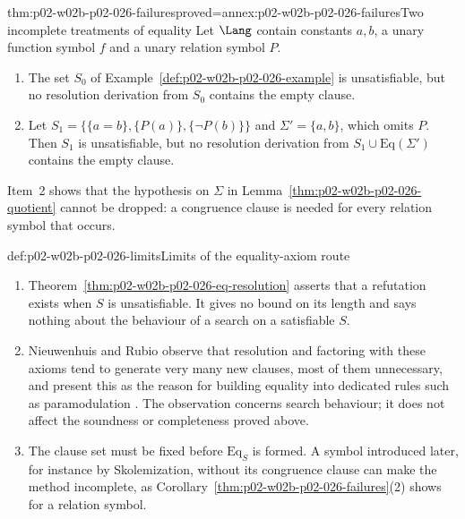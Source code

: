 \begin{hbcorollary}{thm:p02-w02b-p02-026-failures}{proved=annex:p02-w02b-p02-026-failures}{Two incomplete treatments of equality}
Let \(\Lang\) contain constants \(a,b\), a unary function symbol \(f\) and a
unary relation symbol \(P\).
\begin{enumerate}
  \item The set \(S_0\) of Example~\ref{def:p02-w02b-p02-026-example} is
        unsatisfiable, but no resolution derivation from \(S_0\) contains
        the empty clause.
  \item Let \(S_1=\bigl\{\{a=b\},\{P(a)\},\{\neg P(b)\}\bigr\}\) and
        \(\Sigma'=\{a,b\}\), which omits \(P\).  Then \(S_1\) is
        unsatisfiable, but no resolution derivation from
        \(S_1\cup\mathrm{Eq}(\Sigma')\) contains the empty clause.
\end{enumerate}
\end{hbcorollary}

Item~2 shows that the hypothesis on \(\Sigma\) in
Lemma~\ref{thm:p02-w02b-p02-026-quotient} cannot be dropped: a congruence
clause is needed for every relation symbol that occurs.

\begin{hbwarning}{def:p02-w02b-p02-026-limits}{Limits of the equality-axiom route}
\begin{enumerate}
  \item Theorem~\ref{thm:p02-w02b-p02-026-eq-resolution} asserts that a
        refutation exists when \(S\) is unsatisfiable.  It gives no bound on
        its length and says nothing about the behaviour of a search on a
        satisfiable \(S\).
  \item Nieuwenhuis and Rubio observe that resolution and factoring with
        these axioms tend to generate very many new clauses, most of them
        unnecessary, and present this as the reason for building equality
        into dedicated rules such as paramodulation
        \cite[\S1.1, p.~4]{NieuwenhuisRubio2001Typescript}.  The observation
        concerns search behaviour; it does not affect the soundness or
        completeness proved above.
  \item The clause set must be fixed before \(\mathrm{Eq}_S\) is formed.
        A symbol introduced later, for instance by Skolemization, without
        its congruence clause can make the method incomplete, as
        Corollary~\ref{thm:p02-w02b-p02-026-failures}(2) shows for a
        relation symbol.
\end{enumerate}
\end{hbwarning}

